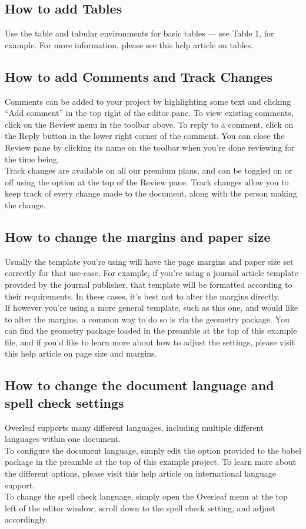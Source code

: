 \documentclass{article}
\begin{document}
    \subsection{ How to add Tables}
    Use the table and tabular environments for basic tables — see Table 1, for example. For more information, please see this help article on tables.
    
    \subsection{ How to add Comments and Track Changes}
    Comments can be added to your project by highlighting some text and clicking “Add comment” in
    the top right of the editor pane. To view existing comments, click on the Review menu in the toolbar above. To reply to a comment, click on the Reply button in the lower right corner of the comment. You can close the Review pane by clicking its name on the toolbar when you’re done reviewing for the time being.\\
    \indent Track changes are available on all our premium plans, and can be toggled on or off using the option at the top of the Review pane. Track changes allow you to keep track of every change made to the document, along with the person making the change.
	
	\subsection{ How to change the margins and paper size}
	Usually the template you’re using will have the page margins and paper size set correctly for that use-case. For example, if you’re using a journal article template provided by the journal publisher, that template will be formatted according to their requirements. In these cases, it’s best not to alter the margins directly.\\
	\indent If however you’re using a more general template, such as this one, and would like to alter the margins, a common way to do so is via the geometry package. You can find the geometry package loaded in the preamble at the top of this example file, and if you’d like to learn more about how to adjust the settings, please visit this help article on page size and margins.
	
	\subsection{How to change the document language and spell check settings}
	Overleaf supports many different languages, including multiple different languages within one document.\\
	\indent To configure the document language, simply edit the option provided to the babel package in the preamble at the top of this example project. To learn more about the different options, please visit this help article on international language support.\\
	\indent To change the spell check language, simply open the Overleaf menu at the top left of the editor window, scroll down to the spell check setting, and adjust accordingly.
	
\end{document}
